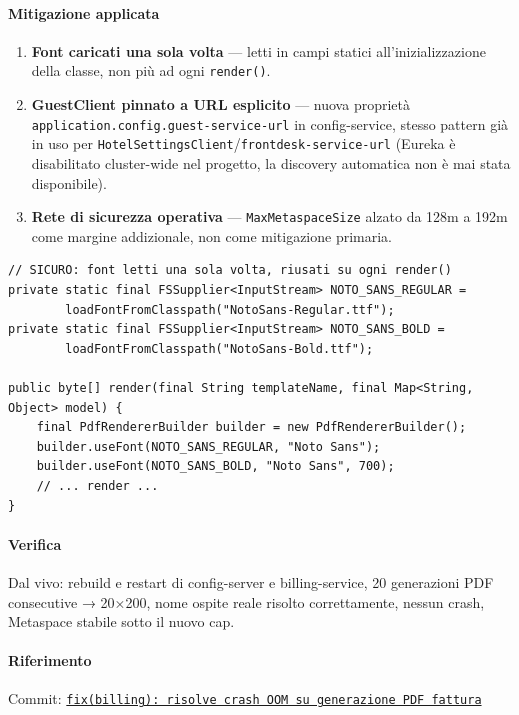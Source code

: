 ﻿\documentclass[a4paper,12pt]{report}
\newcommand{\commitref}[2]{\texttt{\small \href{https://github.com/diegoandruccioli/hotel-pms/commit/#1}{#2}}}
\begin{document}
\paragraph{Mitigazione applicata}
\begin{enumerate}
    \item \textbf{Font caricati una sola volta} --- letti in campi statici
          all'inizializzazione della classe, non più ad ogni \texttt{render()}.
    \item \textbf{GuestClient pinnato a URL esplicito} --- nuova proprietà
          \texttt{application.config.guest-service-url} in config-service, stesso
          pattern già in uso per \texttt{HotelSettingsClient}/\texttt{frontdesk-service-url}
          (Eureka è disabilitato cluster-wide nel progetto, la discovery automatica
          non è mai stata disponibile).
    \item \textbf{Rete di sicurezza operativa} --- \texttt{MaxMetaspaceSize} alzato
          da 128m a 192m come margine addizionale, non come mitigazione primaria.
\end{enumerate}

\begin{securebox}[title={ThymeleafPdfTemplateRenderer.java --- font caricati una sola volta (fix)}]
\begin{lstlisting}[style=java]
// SICURO: font letti una sola volta, riusati su ogni render()
private static final FSSupplier<InputStream> NOTO_SANS_REGULAR =
        loadFontFromClasspath("NotoSans-Regular.ttf");
private static final FSSupplier<InputStream> NOTO_SANS_BOLD =
        loadFontFromClasspath("NotoSans-Bold.ttf");

public byte[] render(final String templateName, final Map<String, Object> model) {
    final PdfRendererBuilder builder = new PdfRendererBuilder();
    builder.useFont(NOTO_SANS_REGULAR, "Noto Sans");
    builder.useFont(NOTO_SANS_BOLD, "Noto Sans", 700);
    // ... render ...
}
\end{lstlisting}
\end{securebox}

\paragraph{Verifica}
Dal vivo: rebuild e restart di config-server e billing-service, 20 generazioni PDF
consecutive → 20×200, nome ospite reale risolto correttamente, nessun crash,
Metaspace stabile sotto il nuovo cap.

\paragraph{Riferimento} Commit: \commitref{c803390}{fix(billing): risolve crash OOM su generazione PDF fattura}
\end{document}
